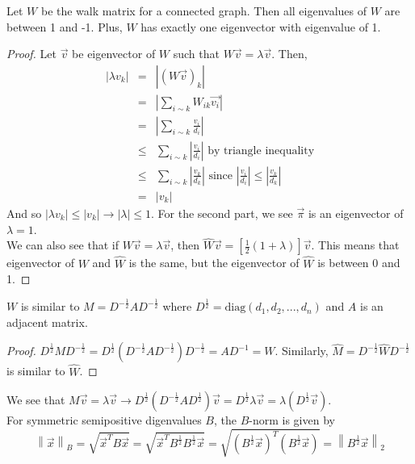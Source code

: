 \documentclass[12pt]{article}
\newcommand\norm[1]{\left\lVert#1\right\rVert}
\begin{document}
\begin{lemma} Let $W$ be the walk matrix for a connected graph. Then all eigenvalues of $W$ are between 1 and -1. Plus, $W$ has exactly one eigenvector with eigenvalue of 1.
\end{lemma}
\begin{proof}
Let $\vec{v}$ be eigenvector of $W$ such that $W\vec{v} = \lambda\vec{v}$. Then, 
\begin{eqnarray*}
|\lambda v_k| &=& |(W\vec{v})_k|\\
&=& \left|\sum_{i \sim k}W_{ik}\vec{v_i}\right|\\
&=& \left|\sum_{i \sim k} \frac{v_i}{d_i}\right|\\
&\leq& \sum_{i \sim k}  \left|\frac{v_i}{d_i}\right| \text{\ \ \ \ \ \ \ \ \ by triangle inequality}\\
&\leq&  \sum_{i \sim k}  \left|\frac{v_k}{d_k}\right| \text{\ \ \ \ \ \ \ \ \ since }\left| \frac{v_i}{d_i}\right| \leq \left| \frac{v_k}{d_k}\right|\\
&=& |v_k|
\end{eqnarray*}
And so $|\lambda v_k| \leq |v_k| \rightarrow |\lambda| \leq 1$. For the second part, we see $\vec{\pi}$ is an eigenvector of $\lambda = 1$.\\We can also see that if $W\vec{v}=\lambda\vec{v}$, then $\widehat{W}\vec{v} = \left[ \frac{1}{2}(1+\lambda)\right]\vec{v}$. This means that eigenvector of $W$ and $\widehat{W}$ is the same, but the eigenvector of $\widehat{W}$ is between 0 and 1.
\end{proof}
\begin{claim} $W$ is similar to $M = D^{-\frac{1}{2}}AD^{-\frac{1}{2}}$ where $D^{\frac{1}{2}} = \text{diag}(d_1, d_2, ..., d_n)$ and $A$ is an adjacent matrix.
\end{claim}
\begin{proof} $D^{\frac{1}{2}}MD^{-\frac{1}{2}} = D^{\frac{1}{2}}(D^{-\frac{1}{2}}AD^{-\frac{1}{2}})D^{-\frac{1}{2}} = AD^{-1} = W$. Similarly, $\widehat{M} = D^{-\frac{1}{2}}\widehat{W}D^{-\frac{1}{2}}$ is similar to $\widehat{W}$.
\end{proof}

We see that $M\vec{v} = \lambda\vec{v} \rightarrow D^{\frac{1}{2}}(D^{-\frac{1}{2}}AD^{\frac{1}{2}})\vec{v} = D^{\frac{1}{2}}\lambda\vec{v} = \lambda(D^{\frac{1}{2}}\vec{v})$.\\ For symmetric semipositive digenvalues $B$, the $B$-norm is given by $$\norm{\vec{x}}_B= \sqrt{\vec{x}^TB\vec{x}} = \sqrt{\vec{x}^TB^{\frac{1}{2}}B^{\frac{1}{2}}\vec{x}} = \sqrt{(B^\frac{1}{2}\vec{x})^T(B^{\frac{1}{2}}\vec{x})} = \norm{B^\frac{1}{2}\vec{x}}_2$$
\end{document}
